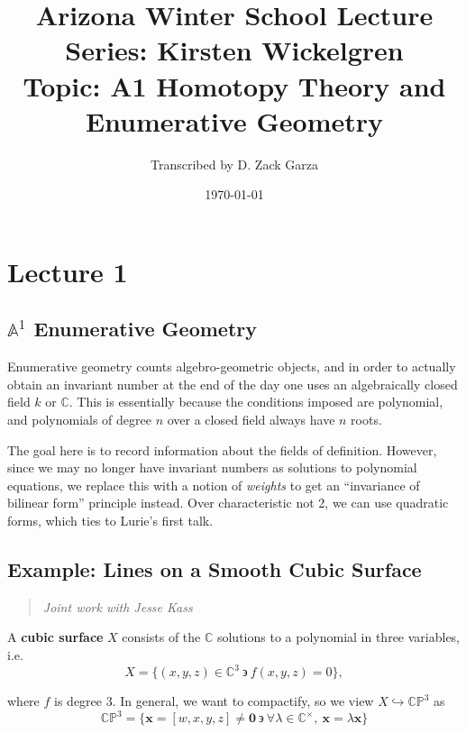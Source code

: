\documentclass[11pt]{scrreprt}
\title{
	\textbf{Arizona Winter School Lecture Series: Kirsten Wickelgren}\\
	{\normalsize Topic: A1 Homotopy Theory and Enumerative Geometry}
}
\author{Transcribed by D. Zack Garza}
\date{\today}
\theoremstyle{definition}
\newcommand{\CC}[0]{{\mathbb{C}}}
\newcommand{\CP}[0]{{\mathbb{CP}}}
\newcommand{\Af}[0]{{\mathbb{A}}}
\newcommand{\suchthat}[0]{{~\backepsilon ~}}
\newcommand{\theset}[1]{\{{#1}\}}
\newcommand{\injects}[0]{\hookrightarrow}
\renewcommand{\vector}[1]{{\mathbf{ {#1} }}}
\begin{document}
\maketitle

\tableofcontents

\hypertarget{lecture-1}{%
\chapter{Lecture 1}\label{lecture-1}}

\hypertarget{af1-enumerative-geometry}{%
\section{\texorpdfstring{\(\Af^1\) Enumerative
Geometry}{\textbackslash{}Af\^{}1 Enumerative Geometry}}\label{af1-enumerative-geometry}}

Enumerative geometry counts algebro-geometric objects, and in order to
actually obtain an invariant number at the end of the day one uses an
algebraically closed field \(k\) or \(\CC\). This is essentially because
the conditions imposed are polynomial, and polynomials of degree \(n\)
over a closed field always have \(n\) roots.

The goal here is to record information about the fields of definition.
However, since we may no longer have invariant numbers as solutions to
polynomial equations, we replace this with a notion of \emph{weights} to
get an ``invariance of bilinear form'' principle instead. Over
characteristic not 2, we can use quadratic forms, which ties to Lurie's
first talk.

\hypertarget{example-lines-on-a-smooth-cubic-surface}{%
\section{Example: Lines on a Smooth Cubic
Surface}\label{example-lines-on-a-smooth-cubic-surface}}

\begin{quote}\textit{
Joint work with Jesse Kass
}\end{quote}

A \textbf{cubic surface} \(X\) consists of the \(\CC\) solutions to a
polynomial in three variables, i.e.~ \[
X = \theset{(x,y,z) \in \CC^3 \suchthat f(x,y,z) = 0},
\]

where \(f\) is degree 3. In general, we want to compactify, so we view
\(X \injects \CP^3\) as \[
\CP^3 = \theset{\vector x = [w,x,y,z]\neq \vector 0 \suchthat \forall \lambda \in \CC^\times,~\vector x = \lambda \vector x}
\]
\end{document}
